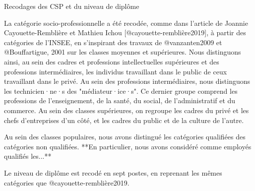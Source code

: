 \documentclass[
  12pt,
]{book}
\begin{document}
\begin{encadre}{Recodages des CSP et du niveau de diplôme}

La catégorie socio-professionnelle a été recodée, comme dans l'article de Joannie Cayouette-Remblière et Mathieu Ichou [@cayouette-remblière2019], à partir des catégories de l'INSEE, en s'inspirant des travaux de @vanzanten2009 et @Bouffartigue, 2001 sur les classes moyennes et supérieures. Nous distinguons ainsi, au sein des cadres et professions intellectuelles supérieures et des professions intermédiaires, les individus travaillant dans le public de ceux travaillant dans le privé. Au sein des professions intermédiaires, nous distinguons les technicien·ne·s des "médiateur·ice·s". Ce dernier groupe comprend les professions de l'enseignement, de la santé, du social, de l'administratif et du commerce. Au sein des classes supérieures, on regroupe les cadres du privé et les chefs d'entreprises d'un côté, et les cadres du public et de la culture de l'autre.

Au sein des classes populaires, nous avons distingué les catégories qualifiées des catégories non qualifiées. **En particulier, nous avons considéré comme employés qualifiés les...**

Le niveau de diplôme est recodé en sept postes, en reprenant les mêmes catégories que @cayouette-remblière2019.

\end{encadre}
\end{document}
